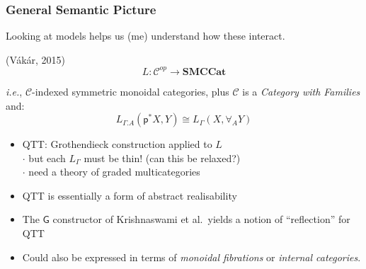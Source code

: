 \documentclass[xetex,serif,mathserif,aspectratio=169]{beamer}
\newcommand{\citationgrey}[1]{\textcolor{black!60}{#1}}
\begin{document}
\begin{frame}
  \frametitle{General Semantic Picture}

  Looking at models helps us (me) understand how these interact.

  \bigskip

  \citationgrey{(V{\'a}k{\'a}r, 2015)}
  \begin{displaymath}
    L : \mathcal{C}^{op} \to \textbf{SMCCat}
  \end{displaymath}

  \emph{i.e.}, $\mathcal{C}$-indexed symmetric monoidal categories,
  plus $\mathcal{C}$ is a \emph{Category with Families} and:
  \begin{displaymath}
    L_{\Gamma.A}(\mathsf{p}^*X,Y) \cong L_\Gamma(X, \forall_AY)
  \end{displaymath}

  \medskip
  \begin{itemize}
  \item QTT: Grothendieck construction applied to $L$ \\
    {\small $\cdot$ \quad but each $L_\Gamma$ must be thin! (can this be relaxed?)} \\
    {\small $\cdot$ \quad need a theory of graded multicategories}
  \item QTT is essentially a form of abstract realisability
  \item The $\mathsf{G}$ constructor of Krishnaswami et al.~yields a
    notion of ``reflection'' for QTT
  \item Could also be expressed in terms of \emph{monoidal fibrations}
    or \emph{internal categories}.
  \end{itemize}

\end{frame}





\end{document}
